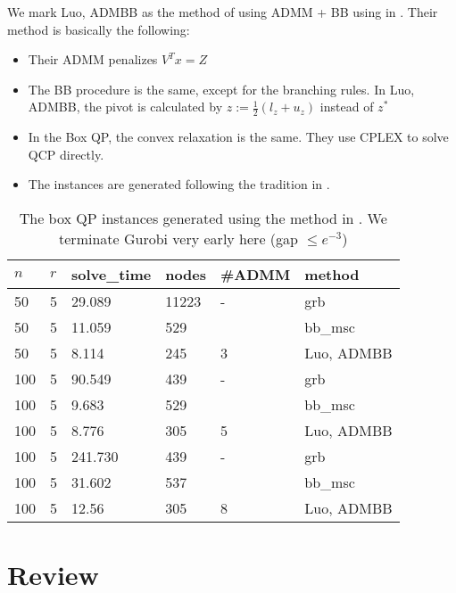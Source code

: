 \documentclass[a4paper, 10pt]{article}
\begin{document}
We mark \textsf{Luo, ADMBB} as the method of using ADMM + BB using in \cite{luo_new_2019}.  Their method is basically the following:
\begin{itemize}
    \item Their ADMM penalizes \(V^Tx = Z\)
    \item The BB procedure is the same, except for the branching rules. In \textsf{Luo, ADMBB}, the pivot is calculated by \(z := \frac{1}{2}(l_z + u_z)\) instead of \(z^*\)
    \item In the Box QP, the convex relaxation is the same. They use CPLEX to solve QCP directly.
    \item The instances are generated following the tradition in \cite{le_an_solving_1997}.
\end{itemize}

\scriptsize
\begin{table}[h!]
    \centering
    \begin{tabular}{llllll}
        \toprule
        \(n\) & \(r\) & solve\_time & nodes & \#ADMM & method              \\
        \midrule
        50    & 5     & 29.089      & 11223 & -      & grb                 \\
        50    & 5     & 11.059      & 529   &        & bb\_msc             \\
        50    & 5     & 8.114       & 245   & 3      & \textsf{Luo, ADMBB} \\
        100   & 5     & 90.549      & 439   & -      & grb                 \\
        100   & 5     & 9.683       & 529   &        & bb\_msc             \\
        100   & 5     & 8.776       & 305   & 5      & \textsf{Luo, ADMBB} \\
        100   & 5     & 241.730     & 439   & -      & grb                 \\
        100   & 5     & 31.602      & 537   &        & bb\_msc             \\
        100   & 5     & 12.56       & 305   & 8      & \textsf{Luo, ADMBB} \\
        \bottomrule
    \end{tabular}
    \caption{The box QP instances generated using the method in \cite{luo_new_2019}.
        We terminate Gurobi very early here (gap \(\le e^{-3}\))}
\end{table}
\normalsize



\section{Review}
\end{document}
